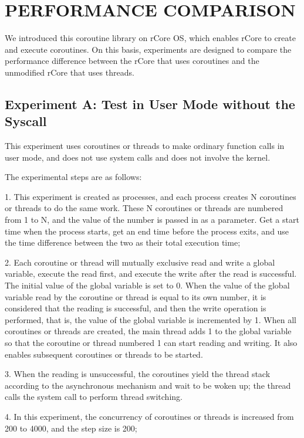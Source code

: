 \documentclass[10pt]{article}
\begin{document}
\section{PERFORMANCE COMPARISON}

We introduced this coroutine library on rCore OS, which enables rCore to create and execute coroutines. On this basis, experiments are designed to compare the performance difference between the rCore that uses coroutines and the unmodified rCore that uses threads.

\subsection{Experiment A: Test in User Mode without the Syscall}

This experiment uses coroutines or threads to make ordinary function calls in user mode, and does not use system calls and does not involve the kernel.

The experimental steps are as follows:

1. This experiment is created as processes, and each process creates N coroutines or threads to do the same work. These N coroutines or threads are numbered from 1 to N, and the value of the number is passed in as a parameter. Get a start time when the process starts, get an end time before the process exits, and use the time difference between the two as their total execution time;

2. Each coroutine or thread will mutually exclusive read and write a global variable, execute the read first, and execute the write after the read is successful. The initial value of the global variable is set to 0. When the value of the global variable read by the coroutine or thread is equal to its own number, it is considered that the reading is successful, and then the write operation is performed, that is, the value of the global variable is incremented by 1. When all coroutines or threads are created, the main thread adds 1 to the global variable so that the coroutine or thread numbered 1 can start reading and writing. It also enables subsequent coroutines or threads to be started.

3. When the reading is unsuccessful, the coroutines yield the thread stack according to the asynchronous mechanism and wait to be woken up; the thread calls the system call to perform thread switching.

4. In this experiment, the concurrency of coroutines or threads is increased from 200 to 4000, and the step size is 200;
\end{document}

